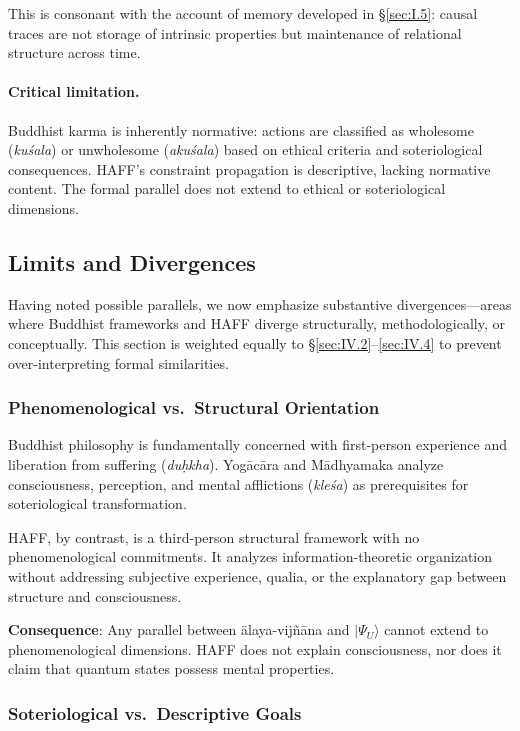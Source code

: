 \documentclass[11pt,a4paper]{article}
\begin{document}
This is consonant with the account of memory developed in §\ref{sec:I.5}: causal traces are not storage of intrinsic properties but maintenance of relational structure across time.

\paragraph{Critical limitation.}
Buddhist karma is inherently normative: actions are classified as wholesome (\emph{kuśala}) or unwholesome (\emph{akuśala}) based on ethical criteria and soteriological consequences. HAFF's constraint propagation is descriptive, lacking normative content. The formal parallel does not extend to ethical or soteriological dimensions.

\subsection{Limits and Divergences}
\label{sec:IV.5}

Having noted possible parallels, we now emphasize substantive divergences—areas where Buddhist frameworks and HAFF diverge structurally, methodologically, or conceptually. This section is weighted equally to §\ref{sec:IV.2}--\ref{sec:IV.4} to prevent over-interpreting formal similarities.

\subsubsection{Phenomenological vs.\ Structural Orientation}

Buddhist philosophy is fundamentally concerned with first-person experience and liberation from suffering (\emph{du\d{h}kha}). Yog\=ac\=ara and M\=adhyamaka analyze consciousness, perception, and mental afflictions (\emph{kleśa}) as prerequisites for soteriological transformation.

HAFF, by contrast, is a third-person structural framework with no phenomenological commitments. It analyzes information-theoretic organization without addressing subjective experience, qualia, or the explanatory gap between structure and consciousness.

\textbf{Consequence}: Any parallel between \=alaya-vijñ\=ana and $|\Psi_U\rangle$ cannot extend to phenomenological dimensions. HAFF does not explain consciousness, nor does it claim that quantum states possess mental properties.

\subsubsection{Soteriological vs.\ Descriptive Goals}
\end{document}
